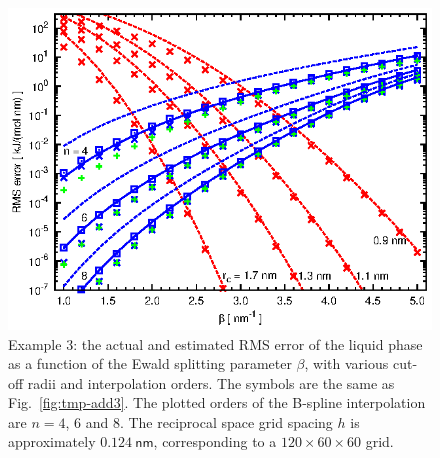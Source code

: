 \documentclass[aps,pre,preprint,unsortedaddress]{revtex4}
\begin{document}
\begin{figure}
  \centering
  \includegraphics[]{fig.order.st.eps}
  \caption{Example 3: the actual and estimated RMS error of the liquid
    phase as a function of the Ewald splitting parameter $\beta$,
    with various cut-off radii and interpolation orders.
    The symbols are the same as Fig.~\ref{fig:tmp-add3}.
    The plotted orders of the B-spline interpolation are $n=4$, 6 and 8.
    The reciprocal space grid spacing $h$ is approximately
    $0.124\:\textsf{nm}$, corresponding to
    a $120\times 60\times 60$ grid.
  }
  \label{fig:tmp-add4}
\end{figure}
\end{document}

